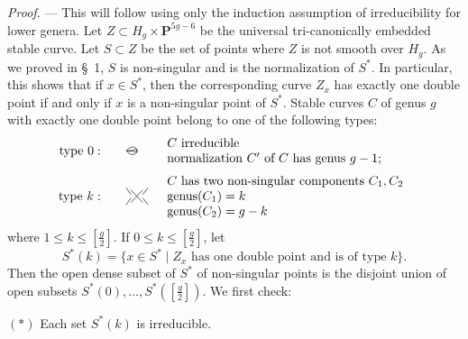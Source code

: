 \documentclass[10pt]{article}
\newcommand{\PP}{\mathbf P}
\begin{document}
\noindent\emph{Proof.} --- This will follow using only the induction assumption of irreducibility for lower genera. Let $Z\subset H_g\times\PP^{5g-6}$ be the universal tri-canonically embedded stable curve. Let $S\subset Z$ be the set of points where $Z$ is not smooth over $H_g$. As we proved in \S~1, $S$ is non-singular and is the normalization of $S^*$. In particular, this shows that if $x\in S^*$, then the corresponding curve $Z_x$ has exactly one double point if and only if $x$ is a non-singular point of $S^*$. Stable curves $C$ of genus $g$ with exactly one double point belong to one of the following types:
\[
\begin{array}{rcll}
\text{type }0:&&
\begin{tikzpicture}[scale=.32,baseline=-.7ex,line width=.45pt]
\draw (0,0).. controls (.45,.55) and (1.0,.35)..(.95,-.15);
\draw (0,0).. controls (.45,-.55) and (1.0,-.35)..(.95,.15);
\draw (.05,.05)--(.9,-.12);
\draw (.05,-.05)--(.9,.12);
\end{tikzpicture}
& \begin{array}{l}C\text{ irreducible}\\
\text{normalization }C'\text{ of }C\text{ has genus }g-1;
\end{array}\\[1.2em]
\text{type }k:&&
\begin{tikzpicture}[scale=.32,baseline=-.7ex,line width=.45pt]
\draw (-.15,-.55)--(.9,.55);
\draw (-.15,.55)--(.9,-.55);
\draw (-.55,.75)--(-.15,.15);
\draw (-.55,-.75)--(-.15,-.15);
\draw (.9,.15)--(1.35,.75);
\draw (.9,-.15)--(1.35,-.75);
\end{tikzpicture}
& \begin{array}{l}C\text{ has two non-singular components }C_1,C_2\\
\operatorname{genus}(C_1)=k\\
\operatorname{genus}(C_2)=g-k
\end{array}
\end{array}
\]
where $1\leq k\leq\left[\frac g2\right]$. If $0\leq k\leq\left[\frac g2\right]$, let
\[
S^*(k)=\{x\in S^*\mid Z_x\text{ has one double point and is of type }k\}.
\]
Then the open dense subset of $S^*$ of non-singular points is the disjoint union of open subsets $S^*(0),\ldots,S^*(\left[\frac g2\right])$. We first check:

\medskip
\noindent$(*)$ Each set $S^*(k)$ is irreducible.
\end{document}
